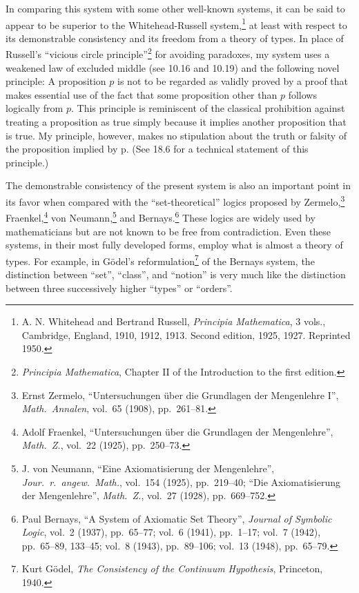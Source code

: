 \documentclass{book}
\begin{document}
In comparing this system with some other well-known systems, it can be said to appear to be superior to the Whitehead-Russell system,\footnote{A. N. Whitehead and Bertrand Russell, \textit{Principia Mathematica}, 3 vols., Cambridge, England, 1910, 1912, 1913. Second edition, 1925, 1927. Reprinted 1950.} at least with respect to its demonstrable consistency and its freedom from a theory of types.  In place of Russell's “vicious circle principle”\footnote{\textit{Principia Mathematica}, Chapter II of the Introduction to the first edition.} for avoiding paradoxes, my system uses a weakened law of excluded middle (see 10.16 and 10.19) and the following novel principle: A proposition \(p\) is not to be regarded as validly proved by a proof that makes essential use of the fact that some proposition other than \(p\) follows logically from \(p\).  This principle is reminiscent of the classical prohibition against treating a proposition as true simply because it implies another proposition that is true.  My principle, however, makes no stipulation about the truth or falsity of the proposition implied by p.  (See 18.6 for a technical statement of this principle.)

The demonstrable consistency of the present system is also an important point in its favor when compared with the “set-theoretical” logics proposed by Zermelo,\footnote{Ernst Zermelo, “Untersuchungen über die Grundlagen der Mengenlehre I”, \textit{Math.\ Annalen}, vol.\ 65 (1908), pp.\ 261–81.} Fraenkel,\footnote{Adolf Fraenkel, “Untersuchungen über die Grundlagen der Mengenlehre”, \textit{Math.\ Z.}, vol.\ 22 (1925), pp.\ 250–73.} von Neumann,\footnote{J. von Neumann, “Eine Axiomatisierung der Mengenlehre”, \textit{Jour.\ r.\ angew.\ Math.}, vol.\ 154 (1925), pp.\ 219–40; “Die Axiomatisierung der Mengenlehre”, \textit{Math.\ Z.}, vol.\ 27 (1928), pp.\ 669–752.} and Bernays.\footnote{Paul Bernays, “A System of Axiomatic Set Theory”, \textit{Journal of Symbolic Logic}, vol.\ 2 (1937), pp.\ 65–77; vol.\ 6 (1941), pp.\ 1–17; vol.\ 7 (1942), pp.\ 65–89, 133–45; vol.\ 8 (1943), pp.\ 89–106; vol.\ 13 (1948), pp.\ 65–79.}  These logics are widely used by mathematicians but are not known to be free from contradiction.  Even these systems, in their most fully developed forms, employ what is almost a theory of types.  For example, in Gödel's reformulation\footnote{Kurt Gödel, \textit{The Consistency of the Continuum Hypothesis}, Princeton, 1940.} of the Bernays system, the distinction between “set”, “class”, and “notion” is very much like the distinction between three successively higher “types” or “orders”.
\end{document}
